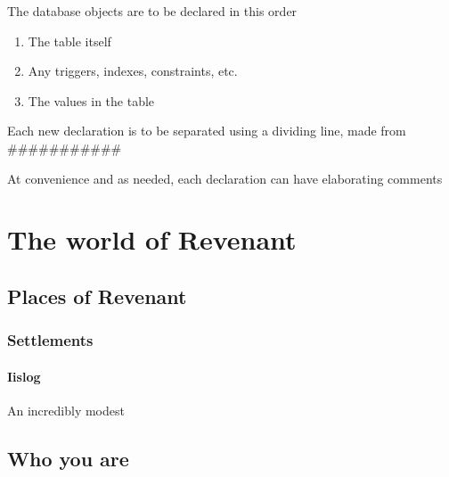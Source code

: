 \documentclass{report}
\begin{document}
The database objects are to be declared in this order
\begin{enumerate}
\item The table itself
\item Any triggers, indexes, constraints, etc.
\item The values in the table
\end{enumerate}

Each new declaration is to be separated using a dividing line, made from ###########

At convenience and as needed, each declaration can have elaborating comments
\chapter*{The world of Revenant}

\section*{Places of Revenant}
\subsection*{Settlements}
\subsubsection*{Iislog}
An incredibly modest 
\section*{Who you are}
\end{document}
